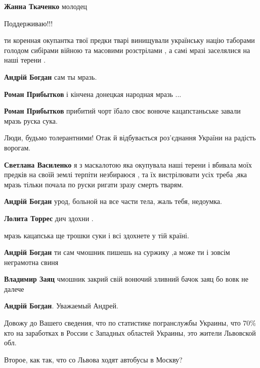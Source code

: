 \begin{itemize}
\begin{itemize}
\textbf{Жанна Ткаченко} молодец
\end{itemize}

Поддерживаю!!!

ти коренная окупантка твої предки тварі винищували українську націю таборами
голодом сибірами війною та масовими розстрілами , а самі мразі заселялися на
наші терени .

\begin{itemize}

\textbf{Андрій Богдан} сам ты мразь.

\textbf{Роман Прибытков} і кінчена донецкая народная мразь ...\Laughey[1.0][white]

\textbf{Роман Прибытков} прибитий чорт їбало своє вонюче кацапстаньське завали мразь руска сука.

Люди, будьмо толерантними! Отак й відбувається роз'єднання України на радість ворогам.

\textbf{Светлана Василенко} я з маскалотою яка окупувала наші терени і вбивала моїх предків на своїй землі терпіти незбираюся , та їх вистрілювати усіх треба ,яка мразь тільки почала по руски ригати зразу смерть тварям.

\textbf{Андрій Богдан} урод, больной на все части тела, жаль тебя, недоумка.

\textbf{Лолита Торрес} дич здохни .

мразь кацапська ще трошки суки і всі здохнете у тій країні.

\textbf{Андрій Богдан} ти сам чмошник пишешь на суржику ,а може ти і зовсім неграмотна свиня

\textbf{Владимир Заяц} чмошник закрий свій вонючий зливний бачок заяц \Laughey[1.0]\Laughey[1.0]\Laughey[1.0] бо вовк не далече \Laughey[1.0]\Laughey[1.0]\Laughey[1.0]\Laughey[1.0]\Laughey[1.0]\Laughey[1.0]\Laughey[1.0]\Laughey[1.0]\Laughey[1.0]

\textbf{Андрій Богдан}. Уважаемый Андрей.

Довожу до Вашего сведения, что по статистике погранслужбы Украины, что 70\% кто
на заработках в России с Западных областей Украины, это жители Львовской обл.

Второе, как так, что со Львова ходят автобусы в Москву?


\end{itemize}
\end{itemize}
